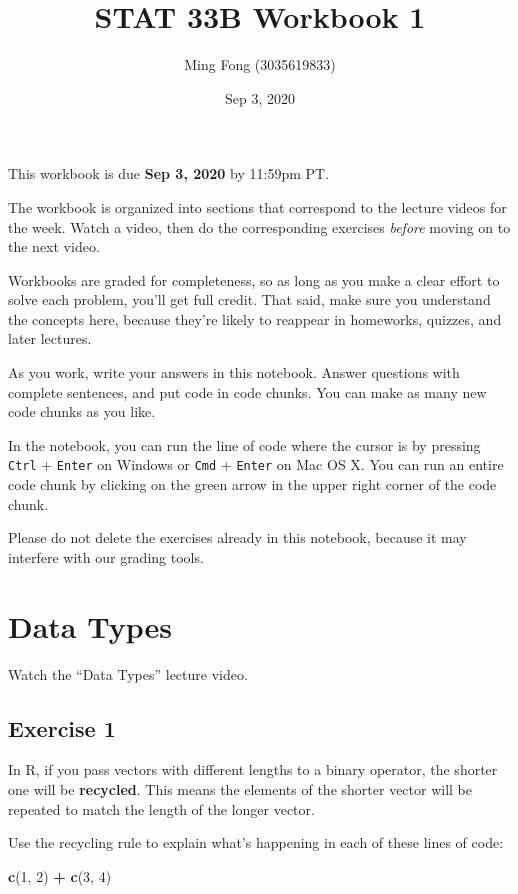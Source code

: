 \documentclass[
]{article}
\title{STAT 33B Workbook 1}
\author{Ming Fong (3035619833)}
\date{Sep 3, 2020}
\newenvironment{Shaded}{\begin{snugshade}}{\end{snugshade}}
\newcommand{\DecValTok}[1]{\textcolor[rgb]{0.00,0.00,0.81}{#1}}
\newcommand{\KeywordTok}[1]{\textcolor[rgb]{0.13,0.29,0.53}{\textbf{#1}}}
\newcommand{\NormalTok}[1]{#1}
\newcommand{\OperatorTok}[1]{\textcolor[rgb]{0.81,0.36,0.00}{\textbf{#1}}}
\newcommand{\StringTok}[1]{\textcolor[rgb]{0.31,0.60,0.02}{#1}}
\begin{document}
\maketitle

This workbook is due \textbf{Sep 3, 2020} by 11:59pm PT.

The workbook is organized into sections that correspond to the lecture
videos for the week. Watch a video, then do the corresponding exercises
\emph{before} moving on to the next video.

Workbooks are graded for completeness, so as long as you make a clear
effort to solve each problem, you'll get full credit. That said, make
sure you understand the concepts here, because they're likely to
reappear in homeworks, quizzes, and later lectures.

As you work, write your answers in this notebook. Answer questions with
complete sentences, and put code in code chunks. You can make as many
new code chunks as you like.

In the notebook, you can run the line of code where the cursor is by
pressing \texttt{Ctrl} + \texttt{Enter} on Windows or \texttt{Cmd} +
\texttt{Enter} on Mac OS X. You can run an entire code chunk by clicking
on the green arrow in the upper right corner of the code chunk.

Please do not delete the exercises already in this notebook, because it
may interfere with our grading tools.

\hypertarget{data-types}{%
\section{Data Types}\label{data-types}}

Watch the ``Data Types'' lecture video.

\hypertarget{exercise-1}{%
\subsection{Exercise 1}\label{exercise-1}}

In R, if you pass vectors with different lengths to a binary operator,
the shorter one will be \textbf{recycled}. This means the elements of
the shorter vector will be repeated to match the length of the longer
vector.

Use the recycling rule to explain what's happening in each of these
lines of code:

\begin{Shaded}
\begin{Highlighting}[]
\KeywordTok{c}\NormalTok{(}\DecValTok{1}\NormalTok{, }\DecValTok{2}\NormalTok{) }\OperatorTok{+}\StringTok{ }\KeywordTok{c}\NormalTok{(}\DecValTok{3}\NormalTok{, }\DecValTok{4}\NormalTok{)}
\end{Highlighting}
\end{Shaded}
\end{document}
